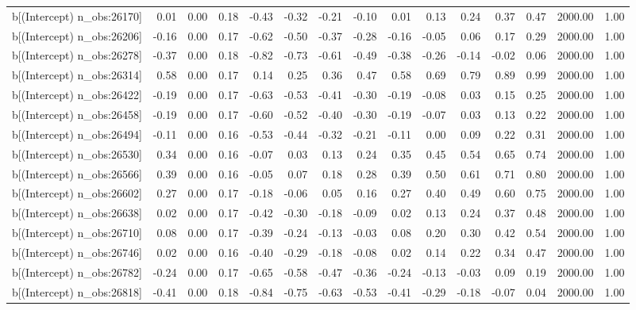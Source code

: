 \begin{table}[ht]
\begin{tabular}{rrrrrrrrrrrrrrr}
  b[(Intercept) n\_obs:26170] & 0.01 & 0.00 & 0.18 & -0.43 & -0.32 & -0.21 & -0.10 & 0.01 & 0.13 & 0.24 & 0.37 & 0.47 & 2000.00 & 1.00 \\ 
  b[(Intercept) n\_obs:26206] & -0.16 & 0.00 & 0.17 & -0.62 & -0.50 & -0.37 & -0.28 & -0.16 & -0.05 & 0.06 & 0.17 & 0.29 & 2000.00 & 1.00 \\ 
  b[(Intercept) n\_obs:26278] & -0.37 & 0.00 & 0.18 & -0.82 & -0.73 & -0.61 & -0.49 & -0.38 & -0.26 & -0.14 & -0.02 & 0.06 & 2000.00 & 1.00 \\ 
  b[(Intercept) n\_obs:26314] & 0.58 & 0.00 & 0.17 & 0.14 & 0.25 & 0.36 & 0.47 & 0.58 & 0.69 & 0.79 & 0.89 & 0.99 & 2000.00 & 1.00 \\ 
  b[(Intercept) n\_obs:26422] & -0.19 & 0.00 & 0.17 & -0.63 & -0.53 & -0.41 & -0.30 & -0.19 & -0.08 & 0.03 & 0.15 & 0.25 & 2000.00 & 1.00 \\ 
  b[(Intercept) n\_obs:26458] & -0.19 & 0.00 & 0.17 & -0.60 & -0.52 & -0.40 & -0.30 & -0.19 & -0.07 & 0.03 & 0.13 & 0.22 & 2000.00 & 1.00 \\ 
  b[(Intercept) n\_obs:26494] & -0.11 & 0.00 & 0.16 & -0.53 & -0.44 & -0.32 & -0.21 & -0.11 & 0.00 & 0.09 & 0.22 & 0.31 & 2000.00 & 1.00 \\ 
  b[(Intercept) n\_obs:26530] & 0.34 & 0.00 & 0.16 & -0.07 & 0.03 & 0.13 & 0.24 & 0.35 & 0.45 & 0.54 & 0.65 & 0.74 & 2000.00 & 1.00 \\ 
  b[(Intercept) n\_obs:26566] & 0.39 & 0.00 & 0.16 & -0.05 & 0.07 & 0.18 & 0.28 & 0.39 & 0.50 & 0.61 & 0.71 & 0.80 & 2000.00 & 1.00 \\ 
  b[(Intercept) n\_obs:26602] & 0.27 & 0.00 & 0.17 & -0.18 & -0.06 & 0.05 & 0.16 & 0.27 & 0.40 & 0.49 & 0.60 & 0.75 & 2000.00 & 1.00 \\ 
  b[(Intercept) n\_obs:26638] & 0.02 & 0.00 & 0.17 & -0.42 & -0.30 & -0.18 & -0.09 & 0.02 & 0.13 & 0.24 & 0.37 & 0.48 & 2000.00 & 1.00 \\ 
  b[(Intercept) n\_obs:26710] & 0.08 & 0.00 & 0.17 & -0.39 & -0.24 & -0.13 & -0.03 & 0.08 & 0.20 & 0.30 & 0.42 & 0.54 & 2000.00 & 1.00 \\ 
  b[(Intercept) n\_obs:26746] & 0.02 & 0.00 & 0.16 & -0.40 & -0.29 & -0.18 & -0.08 & 0.02 & 0.14 & 0.22 & 0.34 & 0.47 & 2000.00 & 1.00 \\ 
  b[(Intercept) n\_obs:26782] & -0.24 & 0.00 & 0.17 & -0.65 & -0.58 & -0.47 & -0.36 & -0.24 & -0.13 & -0.03 & 0.09 & 0.19 & 2000.00 & 1.00 \\ 
  b[(Intercept) n\_obs:26818] & -0.41 & 0.00 & 0.18 & -0.84 & -0.75 & -0.63 & -0.53 & -0.41 & -0.29 & -0.18 & -0.07 & 0.04 & 2000.00 & 1.00 \\ 

\end{tabular}
\end{table}

